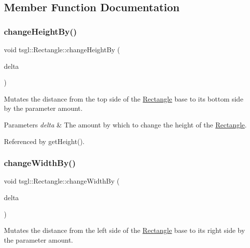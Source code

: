 \subsection{Member Function Documentation}
\mbox{\label{classtsgl_1_1_rectangle_a22ef2c95953f9083334f95e406ff6800}} 
\subsubsection{\texorpdfstring{change\+Height\+By()}{changeHeightBy()}}
{\footnotesize\ttfamily void tsgl\+::\+Rectangle\+::change\+Height\+By (\begin{DoxyParamCaption}\item[{G\+Lfloat}]{delta }\end{DoxyParamCaption})}



Mutates the distance from the top side of the \hyperlink{classtsgl_1_1_rectangle}{Rectangle} base to its bottom side by the parameter amount. 


\begin{DoxyParams}{Parameters}
{\em delta} & The amount by which to change the height of the \hyperlink{classtsgl_1_1_rectangle}{Rectangle}. \\
\hline
\end{DoxyParams}


Referenced by get\+Height().

\mbox{\label{classtsgl_1_1_rectangle_aa0114936bf85578502866ab51df1232f}} 
\subsubsection{\texorpdfstring{change\+Width\+By()}{changeWidthBy()}}
{\footnotesize\ttfamily void tsgl\+::\+Rectangle\+::change\+Width\+By (\begin{DoxyParamCaption}\item[{G\+Lfloat}]{delta }\end{DoxyParamCaption})}



Mutates the distance from the left side of the \hyperlink{classtsgl_1_1_rectangle}{Rectangle} base to its right side by the parameter amount. 


